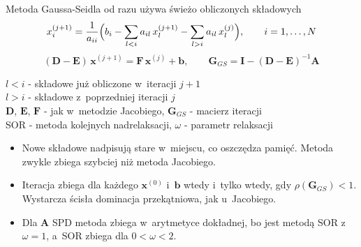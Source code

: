 \begin{frame}{Metoda Gaussa-Seidla od razu używa świeżo obliczonych składowych}
  \tightdisplays\eqtop
  \[ x_i^{(j+1)} = \frac{1}{a_{ii}} \Bigl( b_i - \sum_{l < i} a_{il} \, x_l^{(j+1)} - \sum_{l > i} a_{il} \, x_l^{(j)} \Bigr), \qquad i = 1, \dots, N \]
  \[ (\mathbf{D} - \mathbf{E}) \, \mathbf{x}^{(j+1)} = \mathbf{F} \, \mathbf{x}^{(j)} + \mathbf{b}, \qquad \mathbf{G}_{GS} = \mathbf{I} - (\mathbf{D} - \mathbf{E})^{-1} \mathbf{A} \]
  \par\vspace{1mm}
  {\footnotesize
  $l < i$ - składowe już obliczone w~iteracji $j+1$\\
  $l > i$ - składowe z~poprzedniej iteracji $j$\\
  $\mathbf{D}$, $\mathbf{E}$, $\mathbf{F}$ - jak w~metodzie Jacobiego, $\mathbf{G}_{GS}$ - macierz iteracji\\
  SOR - metoda kolejnych nadrelaksacji, $\omega$ - parametr relaksacji\par}
  \begin{itemize}
    \item Nowe składowe nadpisują stare w~miejscu, co oszczędza pamięć. Metoda zwykle zbiega szybciej niż metoda Jacobiego.
    \item Iteracja zbiega dla każdego $\mathbf{x}^{(0)}$ i~$\mathbf{b}$ wtedy i~tylko wtedy, gdy $\rho(\mathbf{G}_{GS}) < 1$. Wystarcza ścisła dominacja przekątniowa, jak u~Jacobiego.
    \item Dla $\mathbf{A}$ SPD metoda zbiega w~arytmetyce dokładnej, bo jest metodą SOR z~$\omega = 1$, a~SOR zbiega dla $0 < \omega < 2$.
  \end{itemize}
\end{frame}
